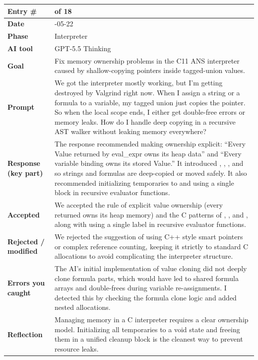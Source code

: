 \documentclass[11pt,a4paper]{article}
\newcommand{\code}[1]{\texttt{\detokenize{#1}}}
\newcommand{\entrygap}{\vspace{8pt}}
\newenvironment{journalentry}{%
  \begin{center}\small\renewcommand{\arraystretch}{1.22}%
  \begin{tabular}{|>{\columncolor{anscodebg}\bfseries}p{3.0cm}|>{\RaggedRight\arraybackslash}p{12.25cm}|}%
  \hline
}{%
  \end{tabular}\end{center}\entrygap
}
\begin{document}
\begin{journalentry}
Entry \# & 16 of 18 \\ \hline
Date & 2026-05-22 \\ \hline
Phase & Interpreter \\ \hline
AI tool & GPT-5.5 Thinking \\ \hline
Goal & Fix memory ownership problems in the C11 ANS interpreter caused by shallow-copying pointers inside tagged-union values. \\ \hline
Prompt & We got the interpreter mostly working, but I'm getting destroyed by Valgrind right now. When I assign a string or a formula to a variable, my tagged union just copies the pointer. So when the local scope ends, I either get double-free errors or memory leaks. How do I handle deep copying in a recursive AST walker without leaking memory everywhere? \\ \hline
Response (key part) & The response recommended making ownership explicit: ``Every Value returned by eval\_expr owns its heap data'' and ``Every variable binding owns its stored Value.'' It introduced \code{value\_free}, \code{value\_clone}, \code{value\_move}, and \code{value\_replace} so strings and formulas are deep-copied or moved safely. It also recommended initializing temporaries to \code{VAL\_VOID} and using a single \code{cleanup:} block in recursive evaluator functions. \\ \hline
Accepted & We accepted the rule of explicit value ownership (every returned \code{Value} owns its heap memory) and the C patterns of \code{value\_clone}, \code{value\_move}, and \code{value\_replace}, along with using a single \code{cleanup:} label in recursive evaluator functions. \\ \hline
Rejected / modified & We rejected the suggestion of using C++ style smart pointers or complex reference counting, keeping it strictly to standard C allocations to avoid complicating the interpreter structure. \\ \hline
Errors you caught & The AI's initial implementation of value cloning did not deeply clone formula parts, which would have led to shared formula arrays and double-frees during variable re-assignments. I detected this by checking the formula clone logic and added nested allocations. \\ \hline
Reflection & Managing memory in a C interpreter requires a clear ownership model. Initializing all temporaries to a void state and freeing them in a unified cleanup block is the cleanest way to prevent resource leaks. \\ \hline
\end{journalentry}
\end{document}
